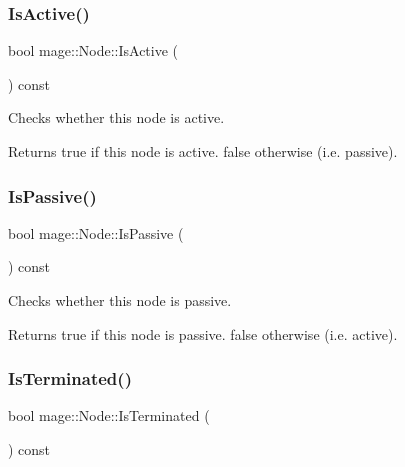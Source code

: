 \subsubsection{\texorpdfstring{Is\+Active()}{IsActive()}}
{\footnotesize\ttfamily bool mage\+::\+Node\+::\+Is\+Active (\begin{DoxyParamCaption}{ }\end{DoxyParamCaption}) const\hspace{0.3cm}{\ttfamily [noexcept]}}

Checks whether this node is active.

\begin{DoxyReturn}{Returns}
{\ttfamily true} if this node is active. {\ttfamily false} otherwise (i.\+e. passive). 
\end{DoxyReturn}
\hypertarget{classmage_1_1_node_a5fb6ac39c7e0d630944594cd5426f61a}{}\label{classmage_1_1_node_a5fb6ac39c7e0d630944594cd5426f61a} 
\subsubsection{\texorpdfstring{Is\+Passive()}{IsPassive()}}
{\footnotesize\ttfamily bool mage\+::\+Node\+::\+Is\+Passive (\begin{DoxyParamCaption}{ }\end{DoxyParamCaption}) const\hspace{0.3cm}{\ttfamily [noexcept]}}

Checks whether this node is passive.

\begin{DoxyReturn}{Returns}
{\ttfamily true} if this node is passive. {\ttfamily false} otherwise (i.\+e. active). 
\end{DoxyReturn}
\hypertarget{classmage_1_1_node_af669e446591ecb2d56b44769ba432172}{}\label{classmage_1_1_node_af669e446591ecb2d56b44769ba432172} 
\subsubsection{\texorpdfstring{Is\+Terminated()}{IsTerminated()}}
{\footnotesize\ttfamily bool mage\+::\+Node\+::\+Is\+Terminated (\begin{DoxyParamCaption}{ }\end{DoxyParamCaption}) const\hspace{0.3cm}{\ttfamily [noexcept]}}

